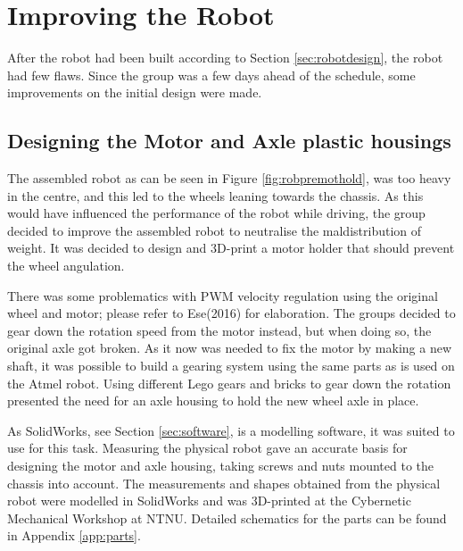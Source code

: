 \section{Improving the Robot}
After the robot had been built according to Section \ref{sec:robotdesign}, the robot had few flaws. Since the group was a few days ahead of the schedule, some improvements on the initial design were made.
\label{sec:improvements}

\subsection{Designing the Motor and Axle plastic housings}
\label{sec:motoraxle}
The assembled robot as can be seen in Figure \ref{fig:robpremothold}, was too heavy in the centre, and this led to the wheels leaning towards the chassis. As this would have influenced the performance of the robot while driving, the group decided to improve the assembled robot to neutralise the maldistribution of weight. It was decided to design and 3D-print a motor holder that should prevent the wheel angulation.

There was some problematics with PWM velocity regulation using the original wheel and motor; please refer to Ese(2016) for elaboration. The groups decided to gear down the rotation speed from the motor instead, but when doing so, the original axle got broken. As it now was needed to fix the motor by making a new shaft, it was possible to build a gearing system using the same parts as is used on the Atmel robot. Using different Lego gears and bricks to gear down the rotation presented the need for an axle housing to hold the new wheel axle in place.

As SolidWorks, see Section \ref{sec:software}, is a modelling software, it was suited to use for this task. Measuring the physical robot gave an accurate basis for designing the motor and axle housing, taking screws and nuts mounted to the chassis into account. The measurements and shapes obtained from the physical robot were modelled in SolidWorks and was 3D-printed at the Cybernetic Mechanical Workshop at NTNU. Detailed schematics for the parts can be found in Appendix \ref{app:parts}.



